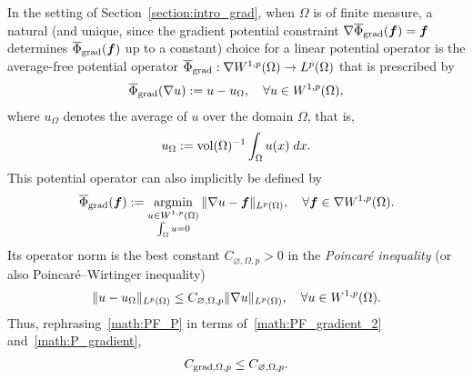 \documentclass[10pt,a4paper]{article}
\newcommand\cye[1]{%
\protect\leavevmode
\begingroup
    \color{blue}%
    #1%
\endgroup
}
\begin{document}
\cye{In the setting of Section~\ref{section:intro_grad}, when $\Omega$ is of finite measure,} a natural \cye{(and unique, since the gradient potential constraint $\nabla \overline \Phi_{\operatorname{grad}}( \bm{f} ) = \bm{f}$ determines $\overline \Phi_{\operatorname{grad}}( \bm{f} )$ up to a constant)} choice \cye{for a linear potential operator} is the average-free potential operator $\overline\Phi_{\operatorname{grad}} : \nabla W^{1,p}(\Omega) \rightarrow L^{p}(\Omega)$ that is prescribed by
\begin{align*}
    \overline\Phi_{\grad}( \nabla u ) \cye{:}= u - u_{\Omega},
    \quad 
    \forall 
    u \in W^{1,p}(\Omega)
    ,
\end{align*}
where $u_\Omega$ denotes the average of $u$ over the domain $\Omega$, that is,
\begin{align*}
    u_{\Omega} := \operatorname{vol}(\Omega)^{-1} \int_{\Omega} u(x) \;dx.
\end{align*}
This potential operator can also implicitly be defined by
\begin{align*}
    \overline \Phi_{\operatorname{grad}}( \bm{f} ) 
    := 
    \operatorname*{{\rm argmin}}\limits_{ \substack{ u \in W^{1,p}(\Omega) \\ \int_\Omega u = 0 } } \| \nabla u - \bm{f} \|_{L^{p}(\Omega)},
    \quad 
    \forall 
    \bm{f} \in \nabla W^{1,p}(\Omega)
    .
\end{align*} 
Its operator norm is the best constant $C_{\varnothing,\Omega,p} > 0$ in the {\em Poincar\'e inequality} (or also Poincar\'e--Wirtinger inequality)
\begin{align}\label{math:P_gradient}
    \| u - u_{\Omega} \|_{L^{p}(\Omega)}
    \leq 
    C_{\varnothing,\Omega,p} \| \nabla u \|_{L^{p}(\Omega)},
    \quad 
    \forall 
    u \in W^{1,p}(\Omega)
    . 
\end{align}
Thus, rephrasing~\eqref{math:PF_P} in terms of~\eqref{math:PF_gradient_2} and~\eqref{math:P_gradient}, 
\begin{align*}
    C_{\operatorname{grad},\Omega,p} \leq C_{\varnothing,\Omega,p}.
\end{align*}
\end{document}
